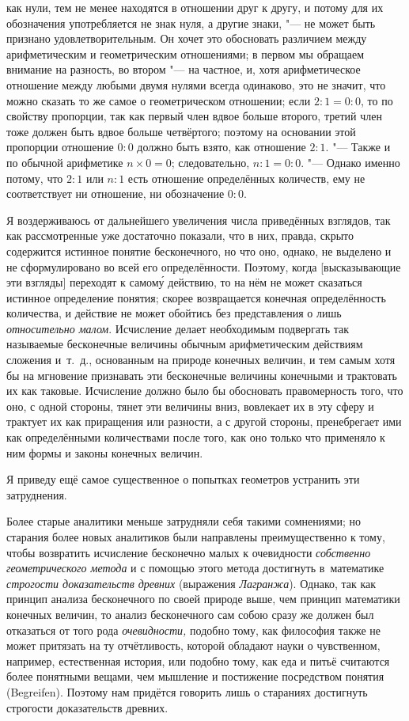 как нули, тем не менее находятся в отношении друг к другу, и потому для их
обозначения употребляется не знак нуля, а другие знаки, "--- не может быть
признано удовлетворительным. Он хочет это обосновать различием между
арифметическим и геометрическим отношениями; в первом мы обращаем внимание на
разность, во втором "--- на частное, и, хотя арифметическое отношение между
любыми двумя нулями всегда одинаково, это не значит, что можно сказать то же
самое о геометрическом отношении; если $2:1=0:0$, то по свойству
пропорции, так как первый член вдвое больше второго, третий член тоже должен
быть вдвое больше четвёртого; поэтому на основании этой пропорции отношение
$0:0$ должно быть взято, как отношение $2:1$. "--- Также и по обычной
арифметике $n\times 0=0$; следовательно, $n:1=0:0$. "--- Однако именно
потому, что $2:1$ или $n:1$ есть отношение определённых количеств, ему не
соответствует ни отношение, ни обозначение $0:0$.

Я воздерживаюсь от дальнейшего увеличения числа приведённых взглядов, так как
рассмотренные уже достаточно показали, что в них, правда, скрыто содержится
истинное понятие бесконечного, но что оно, однако, не выделено и не
сформулировано во всей его определённости. Поэтому, когда [высказывающие эти
взгляды] переходят к самом\'{у} действию, то на нём не может сказаться истинное
определение понятия; скорее возвращается конечная определённость
количества, и действие не может обойтись без представления о лишь
{\em относительно малом}. Исчисление делает необходимым подвергать так
называемые бесконечные величины обычным арифметическим действиям сложения
и~т.~д., основанным на природе конечных величин, и тем самым хотя бы на
мгновение признавать эти бесконечные величины конечными и трактовать их как
таковые. Исчисление должно было бы обосновать правомерность того, что оно, с
одной стороны, тянет эти величины вниз, вовлекает их в эту сферу и трактует их
как приращения или разности, а с другой стороны, пренебрегает ими как
определёнными количествами после того, как оно только что применяло к ним формы
и законы конечных величин.

Я приведу ещё самое существенное о попытках геометров устранить эти
затруднения.

Более старые аналитики меньше затрудняли себя такими сомнениями; но старания
более новых аналитиков были направлены преимущественно к тому, чтобы возвратить
исчисление бесконечно малых к очевидности
{\em собственно геометрического метода} и с помощью этого метода достигнуть
в~математике {\em строгости доказательств древних} (выражения {\em Лагранжа}).
Однако, так как принцип анализа бесконечного по своей природе выше, чем принцип
математики конечных величин, то анализ бесконечного сам собою сразу же должен
был отказаться от того рода {\em очевидности,} подобно тому, как философия
также не может притязать на ту отчётливость, которой обладают науки о
чувственном, например, естественная история, или подобно тому, как еда и питьё
считаются более понятными вещами, чем мышление и постижение посредством понятия
(Be\-grei\-fen). Поэтому нам придётся говорить лишь о стараниях достигнуть
строгости доказательств древних.

